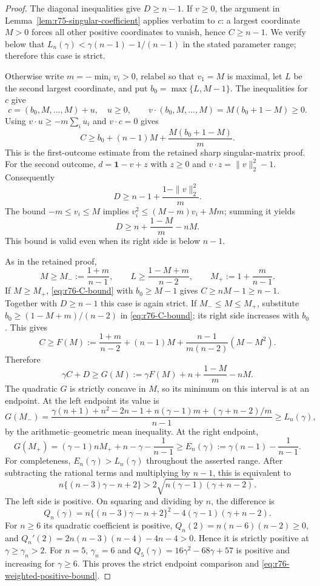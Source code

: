 \begin{proof}
The diagonal inequalities give $D\ge n-1$. If $v\ge0$, the argument
in Lemma~\ref{lem:r75-singular-coefficient} applies verbatim to $c$:
a largest coordinate $M>0$ forces all other positive coordinates to
vanish, hence $C\ge n-1$. We verify below that
$L_n(\gamma)<\gamma(n-1)-1/(n-1)$ in the stated parameter range;
therefore this case is strict.

Otherwise write $m=-\min_i v_i>0$, relabel so that $v_1=M$ is
maximal, let $L$ be the second largest coordinate, and put
$b_0=\max\{L,M-1\}$. The inequalities for $c$ give
\[
 c=(b_0,M,\ldots,M)+u,\quad u\ge0,\qquad
 v\cdot(b_0,M,\ldots,M)=M(b_0+1-M)\ge0.
\]
Using $v\cdot u\ge-m\sum_i u_i$ and $v\cdot c=0$ gives
\begin{equation}\label{eq:r76-C-bound}
 C\ge b_0+(n-1)M+\frac{M(b_0+1-M)}m.
\end{equation}
This is the first-outcome estimate from the retained sharp singular-matrix
proof. For the second outcome, $d=\mathbf1-v+z$ with $z\ge0$ and
$v\cdot z=\|v\|_2^2-1$. Consequently
\[
 D\ge n-1+\frac{1-\|v\|_2^2}{m}.
\]
The bound $-m\le v_i\le M$ implies
$v_i^2\le(M-m)v_i+Mm$; summing it yields
\begin{equation}\label{eq:r76-D-bound}
 D\ge n+\frac{1-M}{m}-nM.
\end{equation}
This bound is valid even when its right side is below $n-1$.

As in the retained proof,
\[
 M\ge M_-:=\frac{1+m}{n-1},\qquad
 L\ge\frac{1-M+m}{n-2},\qquad
 M_+:=1+\frac m{n-1}.
\]
If $M\ge M_+$, \eqref{eq:r76-C-bound} with $b_0\ge M-1$
gives $C\ge nM-1\ge n-1$. Together with $D\ge n-1$ this
case is again strict. If $M_-\le M\le M_+$, substitute
$b_0\ge(1-M+m)/(n-2)$ in \eqref{eq:r76-C-bound}; its right
side increases with $b_0$. This gives
\[
 C\ge F(M):=\frac{1+m}{n-2}+(n-1)M+
                  \frac{n-1}{m(n-2)}(M-M^2).
\]
Therefore
\[
 \gamma C+D\ge G(M):=\gamma F(M)+n+\frac{1-M}{m}-nM.
\]
The quadratic $G$ is strictly concave in $M$, so its minimum on this
interval is at an endpoint. At the left endpoint its value is
\begin{equation}\label{eq:r76-left-endpoint}
 G(M_-)=\frac{\gamma(n+1)+n^2-2n-1+
                  n(\gamma-1)m+(\gamma+n-2)/m}{n-1}
          \ge L_n(\gamma),
\end{equation}
by the arithmetic--geometric mean inequality. At the right endpoint,
\[
 G(M_+)=(\gamma-1)nM_++n-\gamma-\frac1{n-1}
       \ge E_n(\gamma):=\gamma(n-1)-\frac1{n-1}.
\]
For completeness, $E_n(\gamma)>L_n(\gamma)$ throughout the asserted
range. After subtracting the rational terms and multiplying by $n-1$,
this is equivalent to
\[
 n\{(n-3)\gamma-n+2\}
     >2\sqrt{n(\gamma-1)(\gamma+n-2)}.
\]
The left side is positive. On squaring and dividing by $n$, the
difference is
\[
 Q_n(\gamma)=n\{(n-3)\gamma-n+2\}^2
                         -4(\gamma-1)(\gamma+n-2).
\]
For $n\ge6$ its quadratic coefficient is positive,
$Q_n(2)=n(n-6)(n-2)\ge0$, and
$Q_n'(2)=2n(n-3)(n-4)-4n-4>0$. Hence it is strictly positive
at $\gamma\ge\gamma_n>2$. For $n=5$, $\gamma_n=6$ and
$Q_5(\gamma)=16\gamma^2-68\gamma+57$ is positive and increasing
for $\gamma\ge6$. This proves the strict endpoint comparison and
\eqref{eq:r76-weighted-positive-bound}.


\end{proof}
